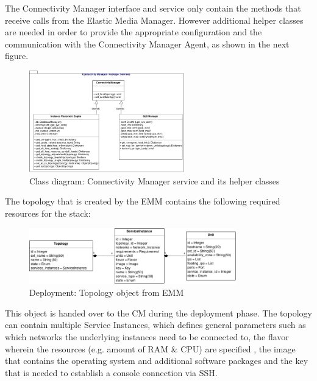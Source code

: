 The Connectivity Manager interface and service only contain the methods that receive calls from the Elastic Media Manager. However additional helper classes are needed in order to provide the appropriate configuration and the communication with the Connectivity Manager Agent, as shown in the next figure.

\begin{figure}[H]
\centering

\includegraphics[width=0.6\textwidth]{images/design/cm_class_diagram}

\caption{Class diagram: Connectivity Manager service and its helper classes}
\end{figure}

The topology that is created by the EMM contains the following required resources for the stack:

\begin{figure}[H]
\centering

\includegraphics[width=0.8\textwidth]{images/design/cm_topology_object}

\caption{Deployment: Topology object from EMM}
\end{figure}

This object is handed over to the CM during the deployment phase. The topology can contain multiple Service Instances, which defines general parameters such as which networks the underlying instances need to be connected to, the flavor wherein the resources (e.g. amount of RAM \& CPU) are specified \cite{openstack-admin}, the image that contains the operating system and additional software packages and the key that is needed to establish a console connection via SSH.


